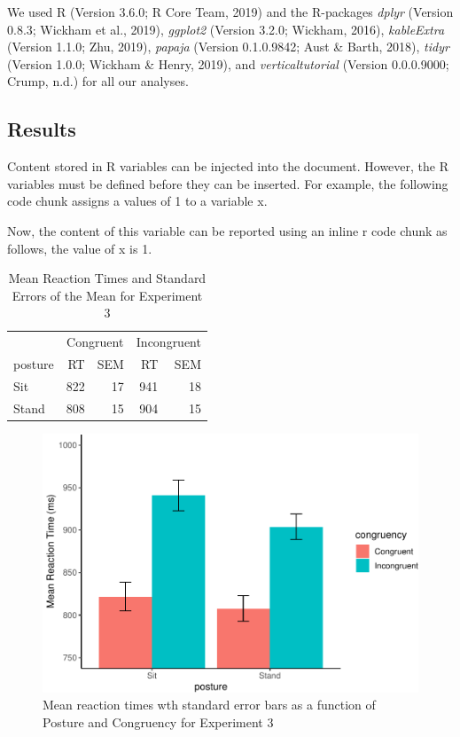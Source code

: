 \documentclass[
  man]{apa6}
\begin{document}
We used R (Version 3.6.0; R Core Team, 2019) and the R-packages \emph{dplyr} (Version 0.8.3; Wickham et al., 2019), \emph{ggplot2} (Version 3.2.0; Wickham, 2016), \emph{kableExtra} (Version 1.1.0; Zhu, 2019), \emph{papaja} (Version 0.1.0.9842; Aust \& Barth, 2018), \emph{tidyr} (Version 1.0.0; Wickham \& Henry, 2019), and \emph{verticaltutorial} (Version 0.0.0.9000; Crump, n.d.) for all our analyses.

\hypertarget{results}{%
\subsection{Results}\label{results}}

Content stored in R variables can be injected into the document. However, the R variables must be defined before they can be inserted. For example, the following code chunk assigns a values of 1 to a variable x.

Now, the content of this variable can be reported using an inline r code chunk as follows, the value of x is 1.

\begin{table}

\caption{\label{tab:meanstable}Mean Reaction Times and Standard Errors of the Mean for Experiment 3}
\centering
\begin{tabular}[t]{lrrrr}
\toprule
\multicolumn{1}{c}{ } & \multicolumn{2}{c}{Congruent} & \multicolumn{2}{c}{Incongruent} \\
\cmidrule(l{3pt}r{3pt}){2-3} \cmidrule(l{3pt}r{3pt}){4-5}
posture & RT & SEM & RT & SEM\\
\midrule
Sit & 822 & 17 & 941 & 18\\
Stand & 808 & 15 & 904 & 15\\
\bottomrule
\end{tabular}
\end{table}

\begin{figure}
\centering
\includegraphics{manuscript_files/figure-latex/stroopfig-1.pdf}
\caption{\label{fig:stroopfig}Mean reaction times wth standard error bars as a function of Posture and Congruency for Experiment 3}
\end{figure}
\end{document}
